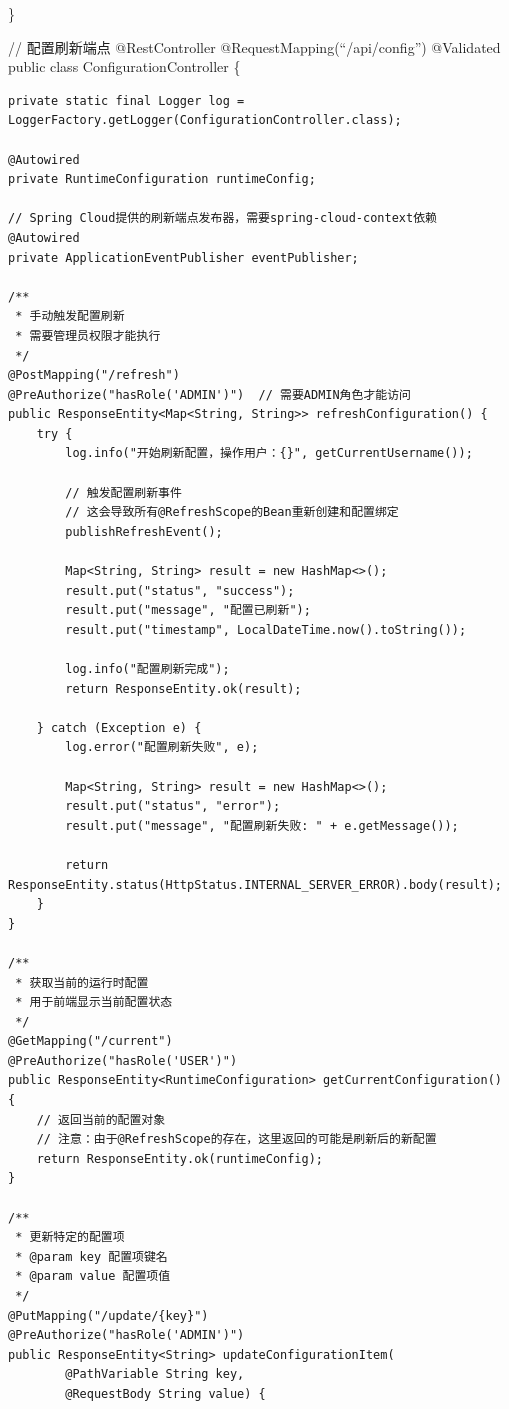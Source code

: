 \}

// 配置刷新端点 @RestController @RequestMapping(``/api/config'') @Validated public class ConfigurationController \{

\begin{verbatim}
private static final Logger log = LoggerFactory.getLogger(ConfigurationController.class);

@Autowired
private RuntimeConfiguration runtimeConfig;

// Spring Cloud提供的刷新端点发布器，需要spring-cloud-context依赖
@Autowired
private ApplicationEventPublisher eventPublisher;

/**
 * 手动触发配置刷新
 * 需要管理员权限才能执行
 */
@PostMapping("/refresh")
@PreAuthorize("hasRole('ADMIN')")  // 需要ADMIN角色才能访问
public ResponseEntity<Map<String, String>> refreshConfiguration() {
    try {
        log.info("开始刷新配置，操作用户：{}", getCurrentUsername());
        
        // 触发配置刷新事件
        // 这会导致所有@RefreshScope的Bean重新创建和配置绑定
        publishRefreshEvent();
        
        Map<String, String> result = new HashMap<>();
        result.put("status", "success");
        result.put("message", "配置已刷新");
        result.put("timestamp", LocalDateTime.now().toString());
        
        log.info("配置刷新完成");
        return ResponseEntity.ok(result);
        
    } catch (Exception e) {
        log.error("配置刷新失败", e);
        
        Map<String, String> result = new HashMap<>();
        result.put("status", "error");
        result.put("message", "配置刷新失败: " + e.getMessage());
        
        return ResponseEntity.status(HttpStatus.INTERNAL_SERVER_ERROR).body(result);
    }
}

/**
 * 获取当前的运行时配置
 * 用于前端显示当前配置状态
 */
@GetMapping("/current")
@PreAuthorize("hasRole('USER')")
public ResponseEntity<RuntimeConfiguration> getCurrentConfiguration() {
    // 返回当前的配置对象
    // 注意：由于@RefreshScope的存在，这里返回的可能是刷新后的新配置
    return ResponseEntity.ok(runtimeConfig);
}

/**
 * 更新特定的配置项
 * @param key 配置项键名
 * @param value 配置项值
 */
@PutMapping("/update/{key}")
@PreAuthorize("hasRole('ADMIN')")
public ResponseEntity<String> updateConfigurationItem(
        @PathVariable String key,
        @RequestBody String value) {
    

\end{verbatim}

